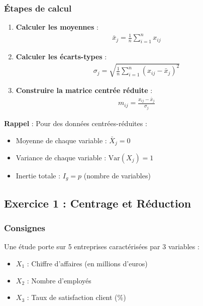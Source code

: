 \documentclass[11pt,a4paper]{article}
\newcommand{\Var}{\text{Var}}
\begin{document}
\subsubsection{Étapes de calcul}

\begin{enumerate}
    \item \textbf{Calculer les moyennes} :
    \begin{align*}
    \bar{x}_j = \frac{1}{n}\sum_{i=1}^{n} x_{ij}
    \end{align*}
    
    \item \textbf{Calculer les écarts-types} :
    \begin{align*}
    \sigma_j = \sqrt{\frac{1}{n}\sum_{i=1}^{n}(x_{ij} - \bar{x}_j)^2}
    \end{align*}
    
    \item \textbf{Construire la matrice centrée réduite} :
    \begin{align*}
    m_{ij} = \frac{x_{ij} - \bar{x}_j}{\sigma_j}
    \end{align*}
\end{enumerate}

\begin{rappelbox}
\textbf{Rappel} : Pour des données centrées-réduites :
\begin{itemize}
    \item Moyenne de chaque variable : $\bar{X}_j = 0$
    \item Variance de chaque variable : $\Var(X_j) = 1$
    \item Inertie totale : $I_g = p$ (nombre de variables)
\end{itemize}
\end{rappelbox}

\newpage

\subsection{Exercice 1 : Centrage et Réduction}

\subsubsection{Consignes}

Une étude porte sur 5 entreprises caractérisées par 3 variables :
\begin{itemize}
    \item $X_1$ : Chiffre d'affaires (en millions d'euros)
    \item $X_2$ : Nombre d'employés
    \item $X_3$ : Taux de satisfaction client (\%)
\end{itemize}
\end{document}
